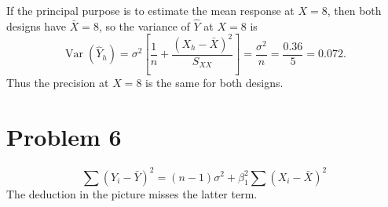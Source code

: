 \documentclass[11pt]{article}
\begin{document}
If the principal purpose is to estimate the mean response at \(X=8\), then both designs have \(\bar X=8\), so the variance of \(\hat Y\) at \(X=8\) is
\[
\operatorname{Var}(\hat Y_h)
=
\sigma^2\left[
\frac{1}{n}
+
\frac{(X_h-\bar X)^2}{S_{XX}}
\right]
=
\frac{\sigma^2}{n}
=
\frac{0.36}{5}
=
0.072.
\]
Thus the precision at \(X=8\) is the same for both designs.

\section*{Problem 6}
\[
\sum (Y_i-\bar Y)^2
=(n-1)\sigma^2+\beta_1^2\sum (X_i-\bar X)^2
\]
The deduction in the picture misses the latter term.
\end{document}
